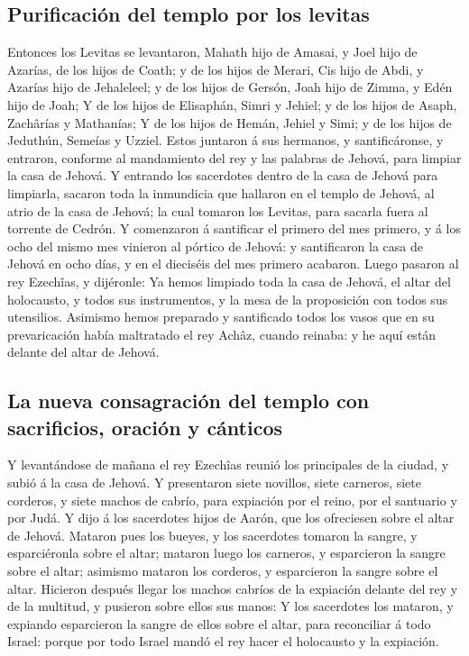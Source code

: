 \hypertarget{purificaciuxf3n-del-templo-por-los-levitas}{%
\subsection{Purificación del templo por los
levitas}\label{purificaciuxf3n-del-templo-por-los-levitas}}

 Entonces los Levitas se levantaron, Mahath hijo de
Amasai, y Joel hijo de Azarías, de los hijos de Coath; y de los hijos de
Merari, Cis hijo de Abdi, y Azarías hijo de Jehaleleel; y de los hijos
de Gersón, Joah hijo de Zimma, y Edén hijo de Joah;  Y de
los hijos de Elisaphán, Simri y Jehiel; y de los hijos de Asaph,
Zachârías y Mathanías;  Y de los hijos de Hemán, Jehiel y
Simi; y de los hijos de Jeduthún, Semeías y Uzziel. 
Estos juntaron á sus hermanos, y santificáronse, y entraron, conforme al
mandamiento del rey y las palabras de Jehová, para limpiar la casa de
Jehová.  Y entrando los sacerdotes dentro de la casa de
Jehová para limpiarla, sacaron toda la inmundicia que hallaron en el
templo de Jehová, al atrio de la casa de Jehová; la cual tomaron los
Levitas, para sacarla fuera al torrente de Cedrón.  Y
comenzaron á santificar el primero del mes primero, y á los ocho del
mismo mes vinieron al pórtico de Jehová: y santificaron la casa de
Jehová en ocho días, y en el dieciséis del mes primero acabaron.
 Luego pasaron al rey Ezechîas, y dijéronle: Ya hemos
limpiado toda la casa de Jehová, el altar del holocausto, y todos sus
instrumentos, y la mesa de la proposición con todos sus utensilios.
 Asimismo hemos preparado y santificado todos los vasos
que en su prevaricación había maltratado el rey Achâz, cuando reinaba: y
he aquí están delante del altar de Jehová.

\hypertarget{la-nueva-consagraciuxf3n-del-templo-con-sacrificios-oraciuxf3n-y-cuxe1nticos}{%
\subsection{La nueva consagración del templo con sacrificios, oración y
cánticos}\label{la-nueva-consagraciuxf3n-del-templo-con-sacrificios-oraciuxf3n-y-cuxe1nticos}}

 Y levantándose de mañana el rey Ezechîas reunió los
principales de la ciudad, y subió á la casa de Jehová.  Y
presentaron siete novillos, siete carneros, siete corderos, y siete
machos de cabrío, para expiación por el reino, por el santuario y por
Judá. Y dijo á los sacerdotes hijos de Aarón, que los ofreciesen sobre
el altar de Jehová.  Mataron pues los bueyes, y los
sacerdotes tomaron la sangre, y esparciéronla sobre el altar; mataron
luego los carneros, y esparcieron la sangre sobre el altar; asimismo
mataron los corderos, y esparcieron la sangre sobre el altar.
 Hicieron después llegar los machos cabríos de la
expiación delante del rey y de la multitud, y pusieron sobre ellos sus
manos:  Y los sacerdotes los mataron, y expiando
esparcieron la sangre de ellos sobre el altar, para reconciliar á todo
Israel: porque por todo Israel mandó el rey hacer el holocausto y la
expiación.

